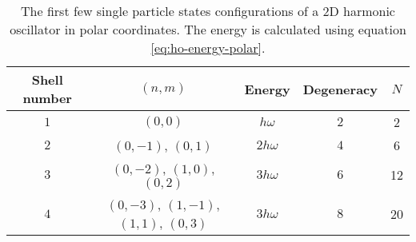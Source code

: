 \documentclass[11pt]{article}
\begin{document}
\begin{table}[H]
	\centering
	\begin{tabular}{c | c | c | c | c}
		Shell number & $(n,m)$ & Energy & Degeneracy & $N$ \\
		\hline
		$1$ & $(0,0)$ & $h\omega$ & $2$ & 2 \\
		$2$ & $(0,-1)$, $(0,1)$ & $2h\omega$ & $4$ & 6 \\
		$3$ & $(0,-2)$, $(1,0)$, $(0,2)$ & $3h\omega$ & $6$ & 12 \\
		$4$ & $(0,-3)$, $(1,-1)$, $(1,1)$, $(0,3)$ & $3h\omega$ & $8$ & 20 \\
	\end{tabular}
	\caption{The first few single particle states configurations of a 2D harmonic oscillator in polar coordinates. The energy is calculated using equation \eqref{eq:ho-energy-polar}.}
	\label{tab:shell-energies}
\end{table}
\end{document}
